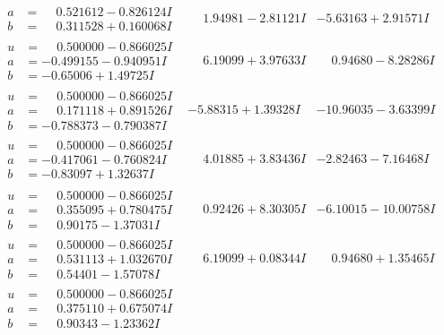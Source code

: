 \documentclass[1p]{elsarticle_modified}
\theoremstyle{definition}
\begin{document}
$$\begin{array}{c|c|c}
\begin{aligned}
a &= \phantom{-}0.521612 - 0.826124 I \\
b &= \phantom{-}0.311528 + 0.160068 I\end{aligned}
 & \phantom{-}1.94981 - 2.81121 I & -5.63163 + 2.91571 I \\ \hline\begin{aligned}
u &= \phantom{-}0.500000 - 0.866025 I \\
a &= -0.499155 - 0.940951 I \\
b &= -0.65006 + 1.49725 I\end{aligned}
 & \phantom{-}6.19099 + 3.97633 I & \phantom{-}0.94680 - 8.28286 I \\ \hline\begin{aligned}
u &= \phantom{-}0.500000 - 0.866025 I \\
a &= \phantom{-}0.171118 + 0.891526 I \\
b &= -0.788373 - 0.790387 I\end{aligned}
 & -5.88315 + 1.39328 I & -10.96035 - 3.63399 I \\ \hline\begin{aligned}
u &= \phantom{-}0.500000 - 0.866025 I \\
a &= -0.417061 - 0.760824 I \\
b &= -0.83097 + 1.32637 I\end{aligned}
 & \phantom{-}4.01885 + 3.83436 I & -2.82463 - 7.16468 I \\ \hline\begin{aligned}
u &= \phantom{-}0.500000 - 0.866025 I \\
a &= \phantom{-}0.355095 + 0.780475 I \\
b &= \phantom{-}0.90175 - 1.37031 I\end{aligned}
 & \phantom{-}0.92426 + 8.30305 I & -6.10015 - 10.00758 I \\ \hline\begin{aligned}
u &= \phantom{-}0.500000 - 0.866025 I \\
a &= \phantom{-}0.531113 + 1.032670 I \\
b &= \phantom{-}0.54401 - 1.57078 I\end{aligned}
 & \phantom{-}6.19099 + 0.08344 I & \phantom{-}0.94680 + 1.35465 I \\ \hline\begin{aligned}
u &= \phantom{-}0.500000 - 0.866025 I \\
a &= \phantom{-}0.375110 + 0.675074 I \\
b &= \phantom{-}0.90343 - 1.23362 I\end{aligned}

\end{array}$$
\end{document}
